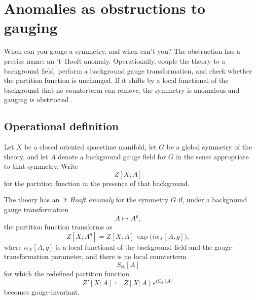 \section{Anomalies as obstructions to gauging}\label{sec:anomaly-definition}

When can you gauge a symmetry, and when can't you?  The obstruction has a precise name: an 't~Hooft anomaly.  Operationally, couple the theory to a background field, perform a background gauge transformation, and check whether the partition function is unchanged.  If it shifts by a local functional of the background that no counterterm can remove, the symmetry is anomalous and gauging is obstructed \cite{GKSW2015,Bhardwaj2023Lectures}.

\subsection{Operational definition}

\begin{assumption}\label{ass:anomaly-background}
Let $X$ be a closed oriented spacetime manifold, let $G$ be a global symmetry of the theory, and let $A$ denote a background gauge field for $G$ in the sense appropriate to that symmetry. Write
\begin{equation*}
Z[X;A]
\end{equation*}
for the partition function in the presence of that background.
\end{assumption}

\begin{definition}\label{def:tHooft-anomaly}
The theory has an \emph{'t~Hooft anomaly} for the symmetry $G$ if, under a background gauge transformation
\begin{equation*}
A\longmapsto A^g,
\end{equation*}
the partition function transforms as
\begin{equation}\label{eq:anomaly-phase}
Z[X;A^g]
=
Z[X;A]\,
\exp\!\bigl(i\alpha_X[A,g]\bigr),
\end{equation}
where $\alpha_X[A,g]$ is a local functional of the background field and the gauge-transformation parameter, and there is no local counterterm
\begin{equation*}
S_{\mathrm{ct}}[A]
\end{equation*}
for which the redefined partition function
\begin{equation*}
Z'[X;A]:=Z[X;A]\,e^{iS_{\mathrm{ct}}[A]}
\end{equation*}
becomes gauge-invariant.
\end{definition}

